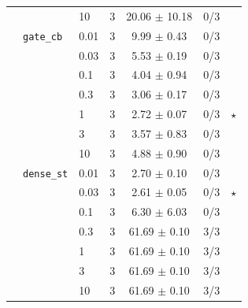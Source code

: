 \begin{tabular}{rllcccc}
 &  & 10 & 3 & 20.06 $\pm$ 10.18 & 0/3 &  \\
 & \texttt{gate\_cb} & 0.01 & 3 & 9.99 $\pm$ 0.43 & 0/3 &  \\
 &  & 0.03 & 3 & 5.53 $\pm$ 0.19 & 0/3 &  \\
 &  & 0.1 & 3 & 4.04 $\pm$ 0.94 & 0/3 &  \\
 &  & 0.3 & 3 & 3.06 $\pm$ 0.17 & 0/3 &  \\
 &  & 1 & 3 & 2.72 $\pm$ 0.07 & 0/3 & $\star$ \\
 &  & 3 & 3 & 3.57 $\pm$ 0.83 & 0/3 &  \\
 &  & 10 & 3 & 4.88 $\pm$ 0.90 & 0/3 &  \\
 & \texttt{dense\_st} & 0.01 & 3 & 2.70 $\pm$ 0.10 & 0/3 &  \\
 &  & 0.03 & 3 & 2.61 $\pm$ 0.05 & 0/3 & $\star$ \\
 &  & 0.1 & 3 & 6.30 $\pm$ 6.03 & 0/3 &  \\
 &  & 0.3 & 3 & 61.69 $\pm$ 0.10 & 3/3 &  \\
 &  & 1 & 3 & 61.69 $\pm$ 0.10 & 3/3 &  \\
 &  & 3 & 3 & 61.69 $\pm$ 0.10 & 3/3 &  \\
 &  & 10 & 3 & 61.69 $\pm$ 0.10 & 3/3 &  \\
\bottomrule
\end{tabular}
